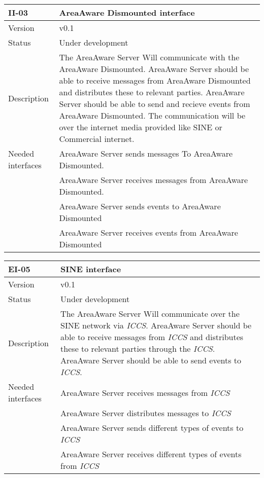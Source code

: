 \begin{longtable}{| p{3.5cm} |  p{10cm} | }
	\hline
	\textbf{II-03} &  \textbf{AreaAware Dismounted interface } \\
	\hline
	Version & v0.1 \\
	\hline
	Status & Under development \\
	\hline
	Description & The AreaAware Server Will communicate with the AreaAware Dismounted. AreaAware Server should be able to receive messages from AreaAware Dismounted and distributes these to relevant parties. AreaAware Server should be able to send and recieve events from AreaAware Dismounted. The communication will be over the internet media provided like SINE or Commercial internet.
	\\
	\hline
	Needed interfaces & AreaAware Server sends messages To AreaAware Dismounted.  \\
		 & AreaAware Server receives messages from AreaAware Dismounted. \\
		 & AreaAware Server sends events to AreaAware Dismounted  \\
		 & AreaAware Server receives events from AreaAware Dismounted  \\
	\hline
\end{longtable}

\begin{longtable}{| p{3.5cm} |  p{10cm} | }
	\hline
	\textbf{EI-05} &  \textbf{SINE interface} \\
	\hline
	Version & v0.1 \\
	\hline
	Status & Under development \\
	\hline
	Description & The AreaAware Server Will communicate over the SINE network via \emph{ICCS}\citep{iccs}. AreaAware Server should be able to receive messages from \emph{ICCS} and distributes these to relevant parties through the \emph{ICCS}.  AreaAware Server should be able to send events to \emph{ICCS}.
	\\
	\hline
	Needed interfaces 
	& AreaAware Server receives messages from \emph{ICCS} \\
	& AreaAware Server distributes messages to \emph{ICCS} \\
	& AreaAware Server sends different types of events to \emph{ICCS} \\
	& AreaAware Server receives different types of events from \emph{ICCS} \\
	\hline
\end{longtable}

